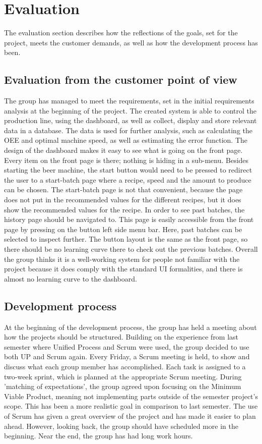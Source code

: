 \section{Evaluation}
The evaluation section describes how the reflections of the goals, set for the
project, meets the customer demands, as well as how the development process has
been.


\subsection{Evaluation from the customer point of view}
The group has managed to meet the requirements, set in the initial requirements
analysis at the beginning of the project. The created system is able to control
the production line, using the dashboard, as well as collect, display and
store relevant data in a database. The data is used for further analysis, such
as calculating the OEE and optimal machine speed, as well as estimating the
error function.
The design of the dashboard makes it easy to see what is going on the front page.
Every item on the front page is there; nothing is hiding in a sub-menu.
Besides starting the beer machine, the start button would need to be pressed
to redirect the user to a start-batch page where a recipe, speed and the amount to
produce can be chosen. The start-batch page is not that convenient, because the page 
does not put in the recommended values for the different recipes, but it does
show the recommended values for the recipe.
In order to see past batches, the history page should be navigated to. This page
is easily accessible from the front page by pressing on the button left
side menu bar. Here, past batches can be selected to inspect further. The button
layout is the same as the front page, so there should be no learning curve there
to check out the previous batches. Overall the group thinks it is a well-working
system for people not familiar with the project because it does comply with the
standard UI formalities, and there is almost no learning curve to the dashboard.


\subsection{Development process}
At the beginning of the development process, the group has held a meeting
about how the projects should be structured. Building on the experience from
last semester where Unified Process and Scrum were used, the group
decided to use both UP and Scrum again. Every Friday, a Scrum meeting is held,
to show and discuss what each group member has accomplished. Each task is
assigned to a two-week sprint, which is planned at the appropriate Scrum
meeting.
During 'matching of expectations', the group agreed upon focusing on the Minimum
Viable Product, meaning not implementing parts outside of the semester project's
scope. This has been a more realistic goal in comparison to last semester.
The use of Scrum has given a great overview of the project and has made it 
easier to plan ahead. However, looking back, the group should have scheduled 
more in the beginning. Near the end, the group has had long work hours.

